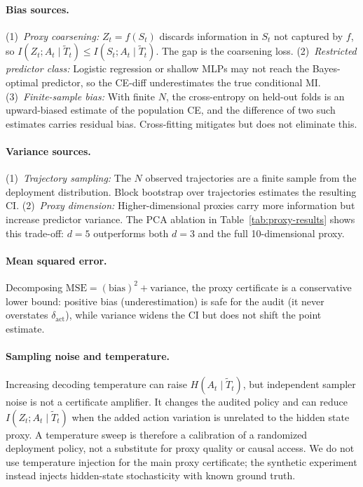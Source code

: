 \documentclass{article}
\begin{document}
  \paragraph{Bias sources.}
  (1)~\emph{Proxy coarsening:} $Z_t = f(S_t)$ discards information in $S_t$ not
  captured by $f$, so $I(Z_t; A_t \mid \tilde T_t) \leq I(S_t; A_t \mid \tilde
  T_t)$. The gap is the coarsening loss.
  (2)~\emph{Restricted predictor class:} Logistic regression or shallow MLPs may
   not reach the Bayes-optimal predictor, so the CE-diff underestimates the true
   conditional MI.
  (3)~\emph{Finite-sample bias:} With finite $N$, the cross-entropy on held-out
  folds is an upward-biased estimate of the population CE, and the difference of
   two such estimates carries residual bias. Cross-fitting mitigates but does
  not eliminate this.

  \paragraph{Variance sources.}
  (1)~\emph{Trajectory sampling:} The $N$ observed trajectories are a finite
  sample from the deployment distribution. Block bootstrap over trajectories
  estimates the resulting CI.
  (2)~\emph{Proxy dimension:} Higher-dimensional proxies carry more information
  but increase predictor variance. The PCA ablation in
  Table~\ref{tab:proxy-results} shows this trade-off: $d{=}5$ outperforms both
  $d{=}3$ and the full 10-dimensional proxy.

  \paragraph{Mean squared error.}
  Decomposing $\text{MSE} = (\text{bias})^2 + \text{variance}$, the proxy
  certificate is a conservative lower bound: positive bias (underestimation) is
  safe for the audit (it never overstates $\delta_\text{act}$), while variance
  widens the CI but does not shift the point estimate.

  \paragraph{Sampling noise and temperature.}
  Increasing decoding temperature can raise $H(A_t \mid \tilde T_t)$, but
  independent sampler noise is not a certificate amplifier. It changes the
  audited policy and can reduce $I(Z_t; A_t \mid \tilde T_t)$ when the added
  action variation is unrelated to the hidden state proxy. A temperature sweep
  is therefore a calibration of a randomized deployment policy, not a substitute
   for proxy quality or causal access. We do not use temperature injection for
  the main proxy certificate; the synthetic experiment instead injects
  hidden-state stochasticity with known ground truth.
\end{document}

